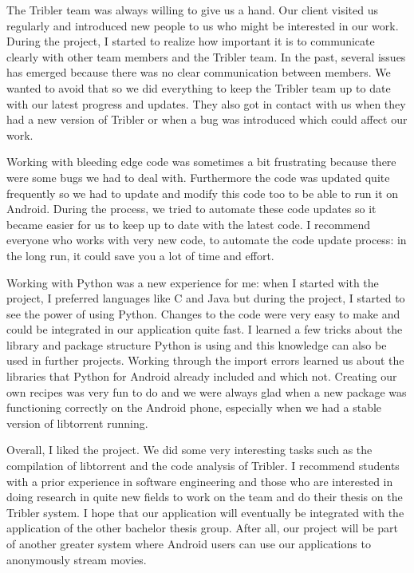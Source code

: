 			The Tribler team was always willing to give us a hand. Our client visited us regularly and introduced new people to us who might be interested in our work. During the project, I started to realize how important it is to communicate clearly with other team members and the Tribler team. In the past, several issues has emerged because there was no clear communication between members. We wanted to avoid that so we did everything to keep the Tribler team up to date with our latest progress and updates. They also got in contact with us when they had a new version of Tribler or when a bug was introduced which could affect our work.
		
			Working with bleeding edge code was sometimes a bit frustrating because there were some bugs we had to deal with. Furthermore the code was updated quite frequently so we had to update and modify this code too to be able to run it on Android. During the process, we tried to automate these code updates so it became easier for us to keep up to date with the latest code. I recommend everyone who works with very new code, to automate the code update process: in the long run, it could save you a lot of time and effort.
		
	  		Working with Python was a new experience for me: when I started with the project, I preferred languages like C and Java but during the project, I started to see the power of using Python. Changes to the code were very easy to make and could be integrated in our application quite fast. I learned a few tricks about the library and package structure Python is using and this knowledge can also be used in further projects. Working through the import errors learned us about the libraries that Python for Android already included and which not. Creating our own recipes was very fun to do and we were always glad when a new package was functioning correctly on the Android phone, especially when we had a stable version of libtorrent running.
	 	
	 		Overall, I liked the project. We did some very interesting tasks such as the compilation of libtorrent and the code analysis of Tribler. I recommend students with a prior experience in software engineering and those who are interested in doing research in quite new fields to work on the team and do their thesis on the Tribler system. I hope that our application will eventually be integrated with the application of the other bachelor thesis group. After all, our project will be part of another greater system where Android users can use our applications to anonymously stream movies.
